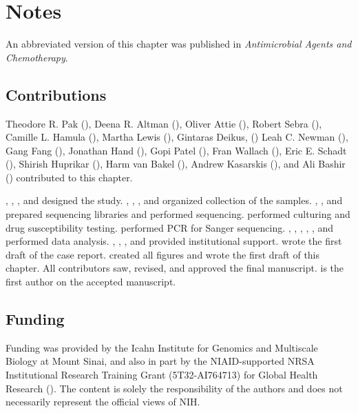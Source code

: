 \section*{Notes}

An abbreviated version of this chapter was published in \textit{Antimicrobial Agents and Chemotherapy}.\autocite{Pak2015a}

\subsection*{Contributions}

Theodore R. Pak (), Deena R. Altman (), Oliver Attie (), Robert Sebra (), Camille L. Hamula (), Martha Lewis (), Gintaras Deikus, ()
Leah C. Newman (), Gang Fang (), Jonathan Hand (), Gopi Patel (), Fran Wallach (), Eric E. Schadt (), Shirish Huprikar (), Harm van Bakel (), Andrew Kasarskis (), and Ali Bashir () contributed to this chapter. 

, , , and  designed the study. , , , and  organized collection of the samples. , , and  prepared sequencing libraries and performed sequencing.  performed culturing and drug susceptibility testing.  performed PCR for Sanger sequencing. , , , , , and  performed data analysis. , , , and  provided institutional support.  wrote the first draft of the case report.  created all figures and wrote the first draft of this chapter. All contributors saw, revised, and approved the final manuscript.  is the first author on the accepted manuscript.

\subsection*{Funding}

Funding was provided by the Icahn Institute for Genomics and Multiscale Biology at Mount Sinai, and also in part by the NIAID-supported NRSA Institutional Research Training Grant (5T32-AI764713) for Global Health Research (). The content is solely the responsibility of the authors and does not necessarily represent the official views of NIH.

